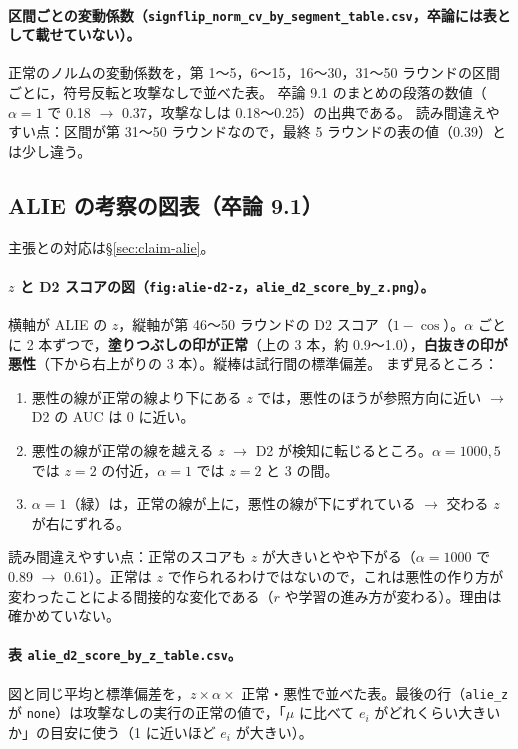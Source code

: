\documentclass[a4j, dvipdfmx]{jsarticle}  %
\begin{document}
\paragraph{区間ごとの変動係数（\texttt{signflip\_norm\_cv\_by\_segment\_table.csv}，卒論には表として載せていない）。}
正常のノルムの変動係数を，第 1〜5，6〜15，16〜30，31〜50 ラウンドの区間ごとに，符号反転と攻撃なしで並べた表。
卒論 9.1 のまとめの段落の数値（$\alpha = 1$ で 0.18 $\rightarrow$ 0.37，攻撃なしは 0.18〜0.25）の出典である。
読み間違えやすい点：区間が第 31〜50 ラウンドなので，最終 5 ラウンドの表の値（0.39）とは少し違う。

\subsection{ALIE の考察の図表（卒論 9.1）}
\label{sec:read-alie}

主張との対応は\S\ref{sec:claim-alie}。

\paragraph{$z$ と D2 スコアの図（\texttt{fig:alie-d2-z}，\texttt{alie\_d2\_score\_by\_z.png}）。}
横軸が ALIE の $z$，縦軸が第 46〜50 ラウンドの D2 スコア（$1 - \cos$）。$\alpha$ ごとに 2 本ずつで，\textbf{塗りつぶしの印が正常}（上の 3 本，約 0.9〜1.0），\textbf{白抜きの印が悪性}（下から右上がりの 3 本）。縦棒は試行間の標準偏差。
まず見るところ：
\begin{enumerate}
  \item 悪性の線が正常の線より下にある $z$ では，悪性のほうが参照方向に近い $\rightarrow$ D2 の AUC は 0 に近い。
  \item 悪性の線が正常の線を越える $z$ $\rightarrow$ D2 が検知に転じるところ。$\alpha = 1000, 5$ では $z = 2$ の付近，$\alpha = 1$ では $z = 2$ と 3 の間。
  \item $\alpha = 1$（緑）は，正常の線が上に，悪性の線が下にずれている $\rightarrow$ 交わる $z$ が右にずれる。
\end{enumerate}
読み間違えやすい点：正常のスコアも $z$ が大きいとやや下がる（$\alpha = 1000$ で 0.89 $\rightarrow$ 0.61）。正常は $z$ で作られるわけではないので，これは悪性の作り方が変わったことによる間接的な変化である（$r$ や学習の進み方が変わる）。理由は確かめていない。

\paragraph{表 \texttt{alie\_d2\_score\_by\_z\_table.csv}。}
図と同じ平均と標準偏差を，$z \times \alpha \times$ 正常・悪性で並べた表。最後の行（\texttt{alie\_z} が \texttt{none}）は攻撃なしの実行の正常の値で，「$\mu$ に比べて $e_i$ がどれくらい大きいか」の目安に使う（1 に近いほど $e_i$ が大きい）。
\end{document}
